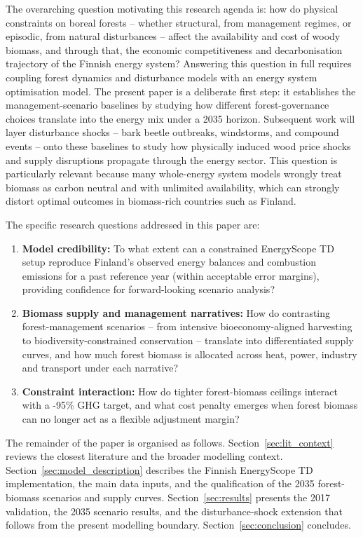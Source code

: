\documentclass{article}
\begin{document}
The overarching question motivating this research agenda is: how do physical constraints on boreal forests -- whether structural, from management regimes, or episodic, from natural disturbances -- affect the availability and cost of woody biomass, and through that, the economic competitiveness and decarbonisation trajectory of the Finnish energy system? Answering this question in full requires coupling forest dynamics and disturbance models with an energy system optimisation model. The present paper is a deliberate first step: it establishes the management-scenario baselines by studying how different forest-governance choices translate into the energy mix under a 2035 horizon. Subsequent work will layer disturbance shocks -- bark beetle outbreaks, windstorms, and compound events -- onto these baselines to study how physically induced wood price shocks and supply disruptions propagate through the energy sector. This question is particularly relevant because many whole-energy system models wrongly treat biomass as carbon neutral and with unlimited availability, which can strongly distort optimal outcomes in biomass-rich countries such as Finland.

The specific research questions addressed in this paper are:

\begin{enumerate}
  \item \textbf{Model credibility:} To what extent can a constrained EnergyScope TD setup reproduce Finland's observed energy balances and combustion emissions for a past reference year (within acceptable error margins), providing confidence for forward-looking scenario analysis?
  \item \textbf{Biomass supply and management narratives:} How do contrasting forest-management scenarios -- from intensive bioeconomy-aligned harvesting to biodiversity-constrained conservation -- translate into differentiated supply curves, and how much forest biomass is allocated across heat, power, industry and transport under each narrative?
  \item \textbf{Constraint interaction:} How do tighter forest-biomass ceilings interact with a -95\% GHG target, and what cost penalty emerges when forest biomass can no longer act as a flexible adjustment margin?
\end{enumerate}

The remainder of the paper is organised as follows. Section~\ref{sec:lit_context} reviews the closest literature and the broader modelling context. Section~\ref{sec:model_description} describes the Finnish EnergyScope TD implementation, the main data inputs, and the qualification of the 2035 forest-biomass scenarios and supply curves. Section~\ref{sec:results} presents the 2017 validation, the 2035 scenario results, and the disturbance-shock extension that follows from the present modelling boundary. Section~\ref{sec:conclusion} concludes.
\end{document}
